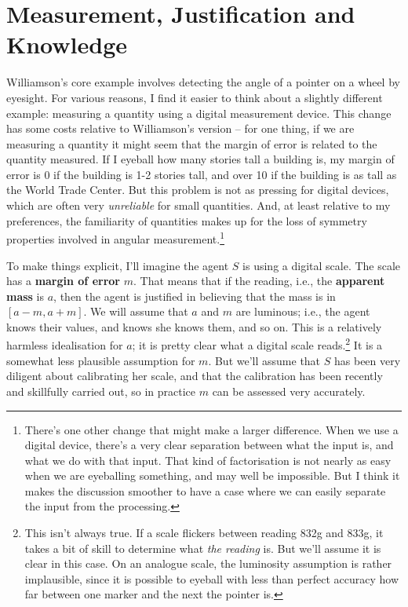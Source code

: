 \section{Measurement, Justification and Knowledge}

Williamson's core example involves detecting the angle of a pointer on a wheel by eyesight. For various reasons, I find it easier to think about a slightly different example: measuring a quantity using a digital measurement device. This change has some costs relative to Williamson's version -- for one thing, if we are measuring a quantity it might seem that the margin of error is related to the quantity measured. If I eyeball how many stories tall a building is, my margin of error is 0 if the building is 1-2 stories tall, and over 10 if the building is as tall as the World Trade Center. But this problem is not as pressing for digital devices, which are often very \textit{unreliable} for small quantities. And, at least relative to my preferences, the familiarity of quantities makes up for the loss of symmetry properties involved in angular measurement.\footnote{There's one other change that might make a larger difference. When we use a digital device, there's a very clear separation between what the input is, and what we do with that input. That kind of factorisation is not nearly as easy when we are eyeballing something, and may well be impossible. But I think it makes the discussion smoother to have a case where we can easily separate the input from the processing.}

To make things explicit, I'll imagine the agent $S$ is using a digital scale. The scale has a \textbf{margin of error} $m$. That means that if the reading, i.e., the \textbf{apparent mass} is $a$, then the agent is justified in believing that the mass is in $[a-m, a+m]$. We will assume that $a$ and $m$ are luminous; i.e., the agent knows their values, and knows she knows them, and so on. This is a relatively harmless idealisation for $a$; it is pretty clear what a digital scale reads.\footnote{This isn't always true. If a scale flickers between reading 832g and 833g, it takes a bit of skill to determine what \textit{the reading} is. But we'll assume it is clear in this case. On an analogue scale, the luminosity assumption is rather implausible, since it is possible to eyeball with less than perfect accuracy how far between one marker and the next the pointer is.} It is a somewhat less plausible assumption for $m$. But we'll assume that $S$ has been very diligent about calibrating her scale, and that the calibration has been recently and skillfully carried out, so in practice $m$ can be assessed very accurately. 

